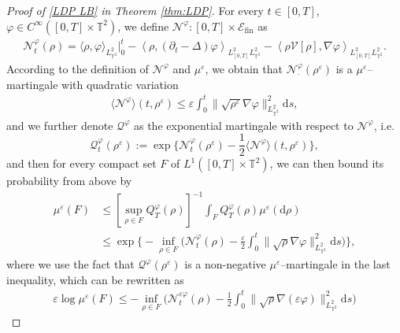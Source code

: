 \begin{proof}[Proof of \eqref{LDP LB} in Theorem \ref{thm:LDP}]
    For every $t\in[0,T]$, $\varphi\in C^{\infty}([0,T]\times\mathbb{T}^2)$, we define $\mathcal{N}^{\varphi}:[0,T]\times \mathcal{E}_{\mathrm{fin}}$ as
\begin{align*}
\mathcal{N}_t^{\varphi}(\rho) = \langle \rho,\varphi \rangle_{L^2_{\mathbb{T}^2}} \Big|_0^t-\left\langle \rho,(\partial_t - \Delta)\varphi\right\rangle_{L^2_{[0,T]}L^2_{\mathbb{T}^2}} - \left\langle\rho \mathcal{V}[\rho],\nabla\varphi \right\rangle_{L^2_{[0,T]}L^2_{\mathbb{T}^2}}.
\end{align*}
According to the definition of $\mathcal{N}^{\varphi}$ and $\mu^{\varepsilon}$, we obtain that
 $\mathcal{N}_{\cdot}^{\varphi}(\rho^{\varepsilon})$ is a $\mu^{\varepsilon}$--martingale with quadratic variation
\begin{align*}
\langle\mathcal{N}^{\varphi}\rangle(t,\rho^{\varepsilon})
\leq\varepsilon \int_0^t\|\sqrt{\rho^{\varepsilon}}\nabla\varphi\|_{L^2_{\mathbb{T}^2}}^2\mathrm{d}s,
\end{align*}
and we further denote $\mathcal{Q}^{\varphi}$ as the exponential martingale with respect to $\mathcal{N}^{\varphi}$, i.e. 
\begin{equation*}
\mathcal{Q}_t^{\varphi}(\rho^{\varepsilon})
:=\exp\Big\{\mathcal{N}_t^{\varphi}(\rho^{\varepsilon})
-\frac{1}{2}\langle\mathcal{N}^{\varphi}\rangle(t,\rho^{\varepsilon})\Big\},
\end{equation*}
and then for every compact set $F$ of $L^1([0,T] \times \mathbb{T}^2)$, we can then bound its probability from above by
\begin{align*}
\mu^{\varepsilon}(F) & \leq \left[\sup_{\rho\in F} Q_T^{\varphi}(\rho)\right]^{-1}\int_{F}Q_T^{\varphi}(\rho)\mu^{\varepsilon}(\mathrm{d}\rho) \\ & \leq \exp\Big\{-\inf_{\rho\in F}\Big(\mathcal{N}_t^{\varphi}(\rho)-\frac{\varepsilon }{2}\int_0^t\|\sqrt{\rho}\nabla\varphi\|_{L^2_{\mathbb{T}^2}}^2\mathrm{d}s\Big)\Big\},
\end{align*}
where we use the fact that $\mathcal{Q}^{\varphi}(\rho^{\varepsilon})$ is a non-negative $\mu^{\varepsilon}$--martingale in the last inequality, which can be rewritten as
\begin{align*}
\varepsilon \log\mu^{\varepsilon}(F) \leq -\inf_{\rho\in F}\Big(\mathcal{N}_t^{\varepsilon \varphi}(\rho)-\frac{1}{2}\int_0^t\|\sqrt{\rho}\nabla(\varepsilon\varphi)\|_{L^2_{\mathbb{T}^2}}^2\mathrm{d}s\Big)
\end{align*}

\end{proof}
